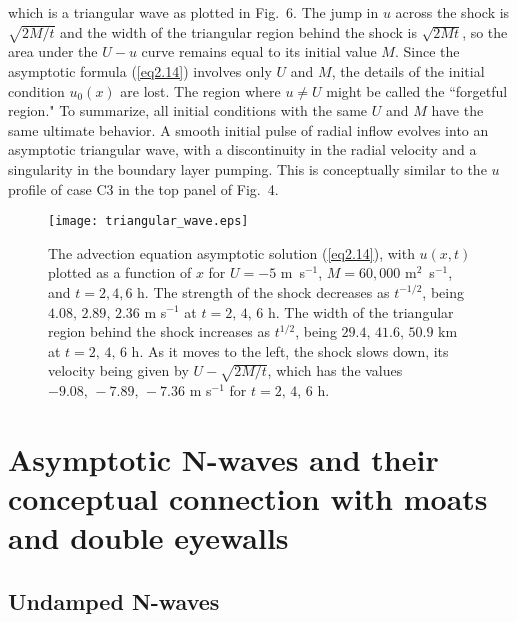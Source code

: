 \documentclass[10pt]{article}
\begin{document}
which is a triangular wave as plotted in Fig.~6.
The jump in $u$ across the shock is $\sqrt{2M/t}$ and the width of
the triangular region behind the shock is $\sqrt{2Mt}$, so the area
under the $U-u$ curve remains equal to its initial value $M$.
Since the asymptotic formula (\ref{eq2.14}) involves
only $U$ and $M$, the details of the initial condition $u_0(x)$ are
lost. The region where $u \ne U$ might be called the ``forgetful region."
To summarize, all initial conditions with the same $U$ and $M$
have the same ultimate behavior. A smooth initial pulse of radial
inflow evolves into an asymptotic triangular wave, with a discontinuity
in the radial velocity and a singularity in the boundary layer pumping.
This is conceptually similar to the $u$ profile of case C3 in the top
panel of Fig.~4.

\begin{figure}[!t]             %
\centerline{\texttt{[image: triangular\_wave.eps]}}
\caption{The advection equation asymptotic solution (\ref{eq2.14}),
with $u(x,t)$ plotted as a function of $x$ for $U=-5$ m\, s$^{-1}$,
$M=60,000$ m$^2$~s$^{-1}$, and $t=2,4,6$ h. The strength of the
shock decreases as $t^{-1/2}$, being $4.08,\, 2.89,\,2.36$ m s$^{-1}$
at $t=2,\, 4,\, 6$ h. The width of the triangular region behind
the shock increases as $t^{1/2}$, being $29.4,\, 41.6,\,50.9$ km
at $t=2,\, 4,\, 6$ h. As it moves to the left, the shock slows
down, its velocity being given by $U-\sqrt{2M/t}$, which has the
values $-9.08,\, -7.89,\,-7.36$ m s$^{-1}$ for $t=2,\, 4,\, 6$ h.}
\end{figure}



\section{Asymptotic N-waves and their conceptual connection
         with moats and double eyewalls}           %

\subsection{Undamped N-waves}
\end{document}
